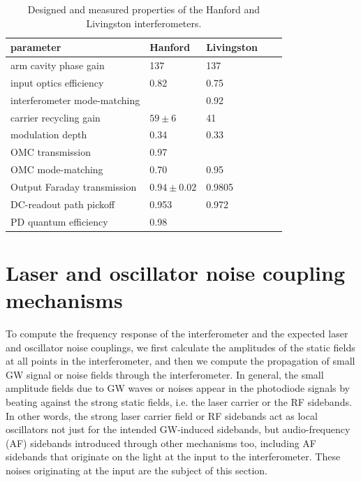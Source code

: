 \begin{table}
\centering
\begin{tabular}{l l l l l}
\hline 
\textbf{parameter}          &\textbf{Hanford}&\textbf{Livingston}  \\
\hline
arm cavity phase gain       & 137            & 137         \\
input optics efficiency     & 0.82           & 0.75        \\
interferometer mode-matching&                & 0.92        \\
carrier recycling gain      & $59\pm6$       & 41          \\
modulation depth            & 0.34           & 0.33        \\
OMC transmission            & 0.97           &             \\
OMC mode-matching           & 0.70           & 0.95        \\
Output Faraday transmission & $0.94\pm0.02$  & 0.9805      \\
DC-readout path pickoff     & 0.953          & 0.972       \\
PD quantum efficiency       & 0.98           &             \\
\hline
\end{tabular}
\caption[Interferometer properties (designed and measured)]{Designed and measured properties of the Hanford and Livingston interferometers.}
\label{tab:ifo-properties}
\end{table}


\section{Laser and oscillator noise coupling mechanisms}


To compute the frequency response of the interferometer and the
expected laser and oscillator noise couplings, we first calculate the
amplitudes of the static fields at all points in the interferometer,
and then we compute the propagation of small GW signal or noise fields
through the interferometer.  In general, the small amplitude fields
due to GW waves or noises appear in the photodiode signals by beating
against the strong static fields, i.e. the laser carrier or the RF
sidebands.  In other words, the strong laser carrier field or RF
sidebands act as local oscillators not just for the intended
GW-induced sidebands, but audio-frequency (AF) sidebands introduced
through other mechanisms too, including AF sidebands that originate on
the light at the input to the interferometer.  These noises originating
at the input are the subject of this section.

